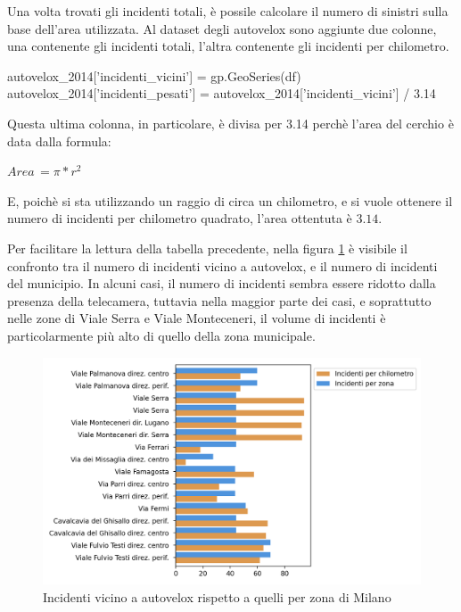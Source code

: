 \documentclass[a4paper,12pt]{report}
\begin{document}

Una volta trovati gli incidenti totali, è possile calcolare il numero di sinistri 
sulla base dell'area utilizzata.
Al dataset degli autovelox sono aggiunte due colonne, una contenente gli incidenti totali, 
l'altra contenente gli incidenti per chilometro.

\begin{code}
autovelox_2014['incidenti_vicini'] = gp.GeoSeries(df)
autovelox_2014['incidenti_pesati'] = autovelox_2014['incidenti_vicini'] / 3.14
\end{code}

Questa ultima colonna, in particolare, è divisa per 3.14 perchè l'area del cerchio 
è data dalla formula: 

\begin{center}
    $Area\, = \pi * r^2$
\end{center}

E, poichè si sta utilizzando un raggio di circa un chilometro, e si vuole ottenere il 
numero di incidenti per chilometro quadrato, l'area ottentuta è $3.14$.

Per facilitare la lettura della tabella precedente, nella figura \ref{fig:confronto-autovelox} 
è visibile il confronto tra il numero di incidenti vicino a autovelox, e il numero di incidenti 
del municipio.
In alcuni casi, il numero di incidenti sembra essere ridotto dalla presenza della telecamera,  
tuttavia nella maggior parte dei casi, e soprattutto nelle zone di Viale Serra e 
Viale Monteceneri, il volume di incidenti è particolarmente più alto di 
quello della zona municipale.

\begin{figure}
    \includegraphics[width=\linewidth]{../src/municipi_milano/conclusioni_municipio.png}
    \caption{Incidenti vicino a autovelox rispetto a quelli per zona di Milano}
    \label{fig:confronto-autovelox}
\end{figure}
\end{document}
